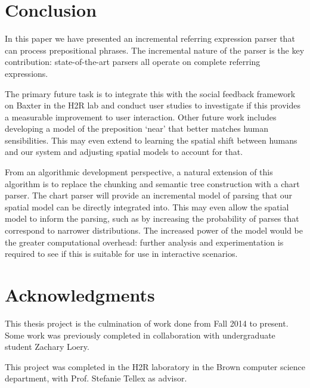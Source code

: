 \documentclass[conference]{IEEEtran}
\numberwithin{equation}{section}
\begin{document}
\section{Conclusion}
In this paper we have presented an incremental referring expression parser that can process prepositional phrases. The incremental nature of the parser is the key contribution: state-of-the-art parsers all operate on complete referring expressions. 

The primary future task is to integrate this with the social feedback framework on Baxter in the H2R lab and conduct user studies to investigate if this provides a measurable improvement to user interaction. Other future work includes developing a model of the preposition `near' that better matches human sensibilities. This may even extend to learning the spatial shift between humans and our system and adjusting spatial models to account for that.

From an algorithmic development perspective, a natural extension of this algorithm is to replace the chunking and semantic tree construction with a chart parser. The chart parser will provide an incremental model of parsing that our spatial model can be directly integrated into. This may even allow the spatial model to inform the parsing, such as by increasing the probability of parses that correspond to narrower distributions. The increased power of the model would be the greater computational overhead: further analysis and experimentation is required to see if this is suitable for use in interactive scenarios.

\section{Acknowledgments}
This thesis project is the culmination of work done from Fall 2014 to present. Some work was previously completed in collaboration with undergraduate student Zachary Loery.

This project was completed in the H2R laboratory in the Brown computer science department, with Prof. Stefanie Tellex as advisor.


\printbibliography
\end{document}
